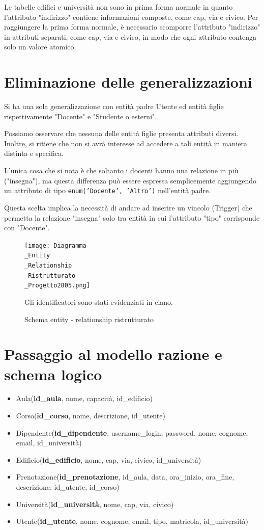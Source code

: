 \documentclass[a4paper, 10pt, oneside]{article} %
\begin{document}
Le tabelle edifici e università non sono in prima forma normale in quanto l'attributo "indirizzo" contiene informazioni composte, come cap, via e civico. Per raggiungere la prima forma normale, è necessario scomporre l'attributo "indirizzo" in attributi separati, come cap, via e civico, in modo che ogni attributo contenga solo un valore atomico.

\section{Eliminazione delle generalizzazioni}

Si ha una sola generalizzazione con entità padre Utente ed entità figlie rispettivamente "Docente" e "Studente o esterni".

Possiamo osservare che nessuna delle entità figlie presenta attributi diversi. Inoltre, si ritiene che non si avrà interesse ad accedere a tali entità in maniera distinta e specifica.

L'unica cosa che si nota è che soltanto i docenti hanno una relazione in più ("insegna"), ma questa differenza può essere espressa semplicemente aggiungendo un attributo di tipo \texttt{enum('Docente', 'Altro')} nell'entità padre.

Questa scelta implica la necessità di andare ad inserire un vincolo (Trigger) che permetta la relazione "insegna" solo tra entità in cui l'attributo "tipo" corrisponde con "Docente".


\begin{figure}[h]
  \centering
\texttt{[image: Diagramma\\\_Entity\\\_Relationship\\\_Ristrutturato\\\_Progetto2805.png]}
  \caption{Schema entity - relationship ristrutturato}
    Gli identificatori sono stati evidenziati in ciano.\\
\end{figure}
\newpage


\section{Passaggio al modello razione e schema logico}
\begin{itemize}
    \item Aula(\textbf{id\_aula}, nome, capacità, id\_edificio)
    \item Corso(\textbf{id\_corso}, nome, descrizione, id\_utente)
    \item Dipendente(\textbf{id\_dipendente}, username\_login, password, nome, cognome, email, id\_università)
    \item Edificio(\textbf{id\_edificio}, nome, cap, via, civico, id\_università)
    \item Prenotazione(\textbf{id\_prenotazione}, id\_aula, data, ora\_inizio, ora\_fine, descrizione, id\_utente, id\_corso)
    \item Università(\textbf{id\_università}, nome, cap, via, civico)
    \item Utente(\textbf{id\_utente}, nome, cognome, email, tipo, matricola, id\_università)
\end{itemize}
\end{document}
